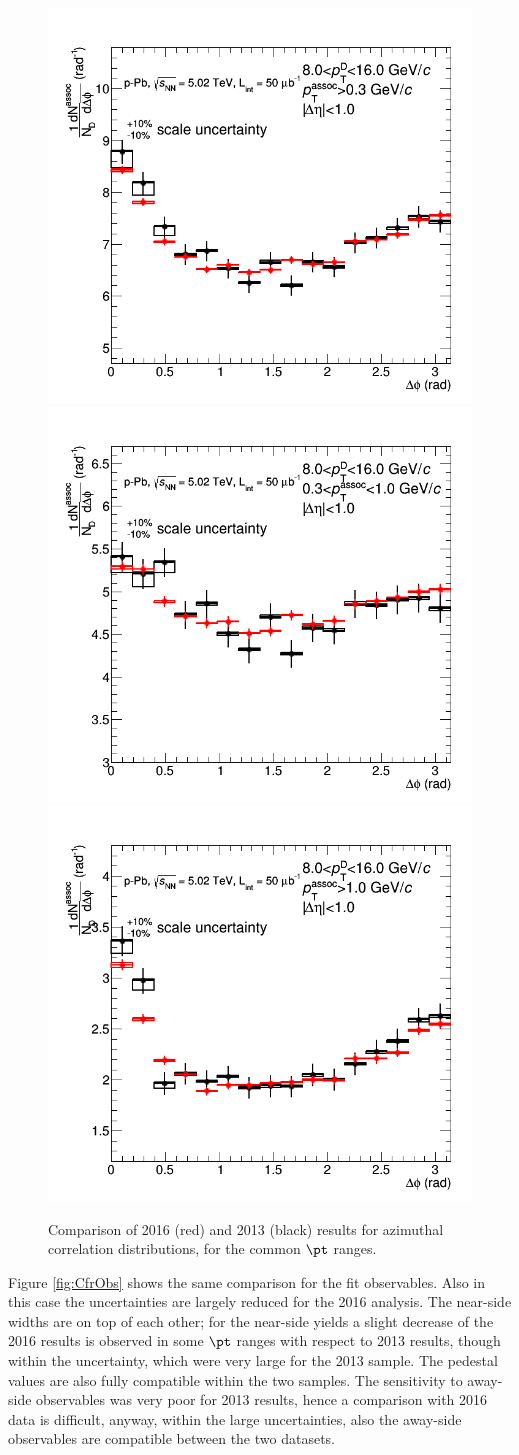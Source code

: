 \begin{figure}[!htbp]
{\includegraphics[width=0.47\linewidth]{figures/Cfr2013vs2016/Average_Cfr_2013_2016_Pt8to16_Thr03to99.png}}
{\includegraphics[width=0.47\linewidth]{figures/Cfr2013vs2016/Average_Cfr_2013_2016_Pt8to16_Thr03to1.png}}
{\includegraphics[width=0.47\linewidth]{figures/Cfr2013vs2016/Average_Cfr_2013_2016_Pt8to16_Thr1to99.png}}
\caption{Comparison of 2016 (red) and 2013 (black) results for azimuthal correlation distributions, for the common $\pt$ ranges.}
\label{fig:CfrAverage}
\end{figure}

Figure \ref{fig:CfrObs} shows the same comparison for the fit observables. Also in this case the uncertainties are largely reduced for the 2016 analysis. The near-side widths are on top of each other; for the near-side yields a slight decrease of the 2016 results is observed in some $\pt$ ranges with respect to 2013 results, though within the uncertainty, which were very large for the 2013 sample. The pedestal values are also fully compatible within the two samples. The sensitivity to away-side observables was very poor for 2013 results, hence a comparison with 2016 data is difficult, anyway, within the large uncertainties, also the away-side observables are compatible between the two datasets.

